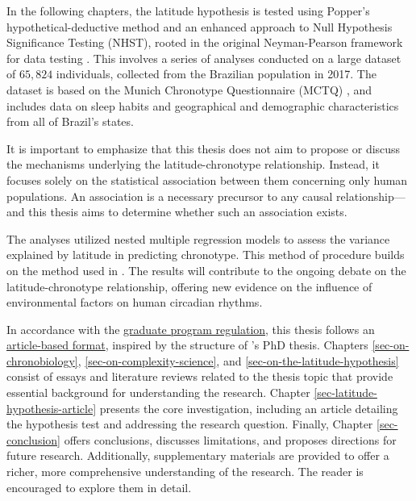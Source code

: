 \documentclass[
12pt,
openright,
oneside,
a4paper,
chapter=TITLE,
section=TITLE,
french,
spanish,
brazil,
english
]{abntex2}
\begin{document}
In the following chapters, the latitude hypothesis is tested using
Popper's hypothetical-deductive method \autocite{popper1979a} and an
enhanced approach to Null Hypothesis Significance Testing (NHST), rooted
in the original Neyman-Pearson framework for data testing
\autocite{neyman1928,neyman1928a,perezgonzalez2015}. This involves a
series of analyses conducted on a large dataset of \(65,824\)
individuals, collected from the Brazilian population in 2017. The
dataset is based on the Munich Chronotype Questionnaire (MCTQ)
\autocite{roenneberg2003b,roenneberg2012a}, and includes data on sleep
habits and geographical and demographic characteristics from all of
Brazil's states.

It is important to emphasize that this thesis does not aim to propose or
discuss the mechanisms underlying the latitude-chronotype relationship.
Instead, it focuses solely on the statistical association between them
concerning only human populations. An association is a necessary
precursor to any causal relationship---and this thesis aims to determine
whether such an association exists.

The analyses utilized nested multiple regression models to assess the
variance explained by latitude in predicting chronotype. This method of
procedure builds on the method used in \textcite{leocadio-miguel2017}.
The results will contribute to the ongoing debate on the
latitude-chronotype relationship, offering new evidence on the influence
of environmental factors on human circadian rhythms.

In accordance with the
\href{https://leginf.usp.br/?resolucao=resolucao-copgr-no-7829-de-03-de-outubro-de-2019\#:~:text=XI\%20\%E2\%80\%93\%20PROCEDIMENTOS\%20PARA\%20DEP\%C3\%93SITO\%20DA\%20DISSERTA\%C3\%87\%C3\%83O}{graduate
program regulation}, this thesis follows an
\href{https://en.wikipedia.org/wiki/Collection_of_articles}{article-based
format}, inspired by the structure of \textcite{reis2020b}'s PhD thesis.
Chapters \ref{sec-on-chronobiology}, \ref{sec-on-complexity-science},
and \ref{sec-on-the-latitude-hypothesis} consist of essays and
literature reviews related to the thesis topic that provide essential
background for understanding the research. Chapter
\ref{sec-latitude-hypothesis-article} presents the core investigation,
including an article detailing the hypothesis test and addressing the
research question. Finally, Chapter \ref{sec-conclusion} offers
conclusions, discusses limitations, and proposes directions for future
research. Additionally, supplementary materials are provided to offer a
richer, more comprehensive understanding of the research. The reader is
encouraged to explore them in detail.
\end{document}

